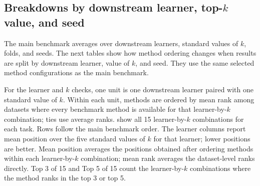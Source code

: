 \subsection{Breakdowns by downstream learner, \texorpdfstring{top-$k$}{top-k} value, and seed}

The main benchmark averages over downstream learners, standard values of $k$,
folds, and seeds. The next tables show how method ordering changes when results
are split by downstream learner, value of $k$, and seed. They use the
same selected method configurations as the main benchmark.

For the learner and $k$ checks, one unit is one downstream learner paired with
one standard value of $k$. Within each unit, methods are ordered by mean rank
among datasets where every benchmark method is available for that learner-by-$k$
combination; ties use average ranks.
show all 15 learner-by-$k$ combinations for each task. Rows follow the main
benchmark order. The
learner columns report mean position over the five standard values of $k$ for
that learner; lower positions are better. Mean position averages the positions
obtained after ordering methods within each learner-by-$k$ combination; mean
rank averages the dataset-level ranks directly. Top 3 of 15 and Top 5 of 15
count the learner-by-$k$ combinations where the method ranks in the top 3 or
top 5.

